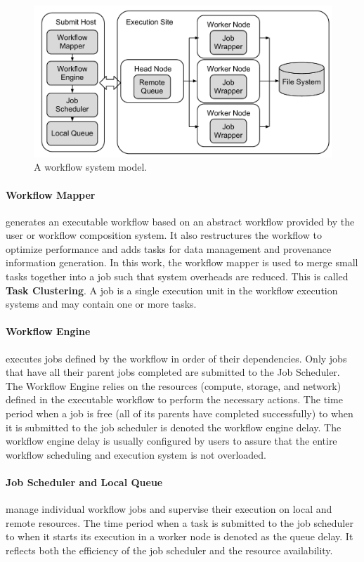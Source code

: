 \documentclass[final]{IEEEtran}
\begin{document}
\begin{figure}[htb]
\centering
  \includegraphics[width=0.95\linewidth]{figure/execution_vertical.pdf}
  \caption{A workflow system model.}
  \label{fig:system}
  \vspace{-15pt}
\end{figure}

\paragraph{Workflow Mapper} generates an executable workflow based on an abstract workflow provided by the user or workflow composition system. It also restructures the workflow to optimize performance and adds tasks for data management and provenance information generation. In this work, the workflow mapper is used to merge small tasks together into a job such that system overheads are reduced. This is called \textbf{Task Clustering}. A job is a single execution unit in the workflow execution systems and may contain one or more tasks. 

\paragraph{Workflow Engine} executes jobs defined by the workflow in order of their dependencies. Only jobs that have all their parent jobs completed are submitted to the Job Scheduler. The Workflow Engine relies on the resources (compute, storage, and network) defined in the executable workflow to perform the necessary actions. The time period when a job is free (all of its parents have completed successfully) to when it is submitted to the job scheduler is denoted the workflow engine delay. The workflow engine delay is usually configured by users to assure that the entire workflow scheduling and execution system is not overloaded. 

\paragraph{Job Scheduler and Local Queue} manage individual workflow jobs and supervise their execution on local and remote resources. The time period when a task is submitted to the job scheduler to when it starts its execution in a worker node is denoted as the queue delay. It reflects both the efficiency of the job scheduler and the resource availability. 
\end{document}
